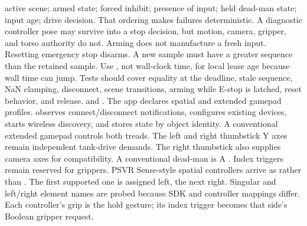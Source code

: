 active scene;\markdownRendererOlItemEnd 
{}armed state;\markdownRendererOlItemEnd 
{}forced inhibit;\markdownRendererOlItemEnd 
{}presence of input;\markdownRendererOlItemEnd 
{}held dead-man state;\markdownRendererOlItemEnd 
{}input age;\markdownRendererOlItemEnd 
{}drive decision.\markdownRendererOlItemEnd 
\markdownRendererOlEnd \markdownRendererInterblockSeparator
{}That ordering makes failures deterministic. A diagnostic controller pose may survive into a stop decision, but motion, camera, gripper, and torso authority do not.\markdownRendererParagraphSeparator
{}Arming does not manufacture a fresh input. Resetting emergency stop disarms. A new sample must have a greater sequence than the retained sample. Use , not wall-clock time, for local lease age because wall time can jump.\markdownRendererParagraphSeparator
{}Tests should cover equality at the deadline, stale sequence, NaN clamping, disconnect, scene transitions, arming while E-stop is latched, reset behavior, and release.\markdownRendererInterblockSeparator
{}
\markdownRendererSectionEnd \markdownRendererSectionBegin
{}\markdownRendererInterblockSeparator
{}\markdownRendererBlockQuoteBegin
{}  and .\markdownRendererBlockQuoteEnd \markdownRendererInterblockSeparator
{}The app declares spatial and extended gamepad profiles.  observes connect/disconnect notifications, configures existing devices, starts wireless discovery, and stores state by object identity.\markdownRendererParagraphSeparator
{}A conventional extended gamepad controls both treads. The left and right thumbstick Y axes remain independent tank-drive demands. The right thumbstick also supplies camera axes for compatibility. A conventional dead-man is A . Index triggers remain reserved for grippers.\markdownRendererParagraphSeparator
{}PSVR Sense-style spatial controllers arrive as  rather than . The first supported one is assigned left, the next right. Singular and left/right element names are probed because SDK and controller mappings differ. Each controller's grip is the hold gesture; its index trigger becomes that side's Boolean gripper request.\markdownRendererParagraphSeparator
